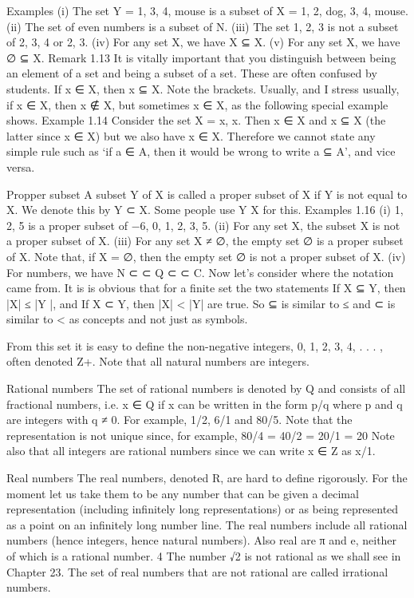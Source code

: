 \bigskip
Examples
(i) The set Y = {1, {3, 4}, mouse} is a subset of X = {1, 2, dog, {3, 4}, mouse}. 
(ii) The set of even numbers is a subset of N.
(iii) The set {1, 2, 3} is not a subset of {2, 3, 4} or {2, 3}. 
(iv) For any set X, we have X ⊆ X. 
(v) For any set X, we have ∅ ⊆ X. 
Remark 1.13 It is vitally important that you distinguish between being an element of a set and being a subset of a set. These are often confused by students. If x ∈ X, then {x} ⊆ X. Note the brackets. Usually, and I stress usually, if x ∈ X, then {x} ∉ X, but sometimes {x} ∈ X, as the following special example shows. 
Example 1.14 Consider the set X = {x, {x}}. Then x ∈ X and {x} ⊆ X (the latter since x ∈ X) but we also have {x} ∈ X. Therefore we cannot state any simple rule such as ‘if a ∈ A, then it would be wrong to write a ⊆ A’, and vice versa.

\bigskip

Propper subset
A subset Y of X is called a proper subset of X if Y is not equal to X. We denote this by Y ⊂ X. Some people use Y  X for this. 
Examples 1.16 
(i) {1, 2, 5} is a proper subset of {−6, 0, 1, 2, 3, 5}. 
(ii) For any set X, the subset X is not a proper subset of X. 
(iii) For any set X ≠ ∅, the empty set ∅ is a proper subset of X. Note that, if X = ∅, then the empty set ∅ is not a proper subset of X.
(iv) For numbers, we have N ⊂  ⊂ Q ⊂  ⊂ C.
Now let’s consider where the notation came from. It is is obvious that for a finite set the two statements If X ⊆ Y, then |X| ≤ |Y |, and If X ⊂ Y, then |X| < |Y| are true. So ⊆ is similar to ≤ and ⊂ is similar to < as concepts and not just as symbols.

From this set it is easy to define the non-negative integers, {0, 1, 2, 3, 4, . . . }, often denoted Z+. Note that all natural numbers are integers.
\bigskip

Rational numbers
The set of rational numbers is denoted by Q and consists of all fractional numbers, i.e. x ∈ Q if x can be written in the form p/q where p and q are integers with q ≠ 0. For example, 1/2, 6/1 and 80/5. Note that the representation is not unique since, for example, 80/4 = 40/2 = 20/1 = 20 Note also that all integers are rational numbers since we can write x ∈ Z as x/1.

Real numbers
The real numbers, denoted R, are hard to define rigorously. For the moment let us take them to be any number that can be given a decimal representation (including infinitely long representations) or as being represented as a point on an infinitely long number line. The real numbers include all rational numbers (hence integers, hence natural numbers). Also real are π and e, neither of which is a rational number. 4 The number √2 is not rational as we shall see in Chapter 23. The set of real numbers that are not rational are called irrational numbers.


